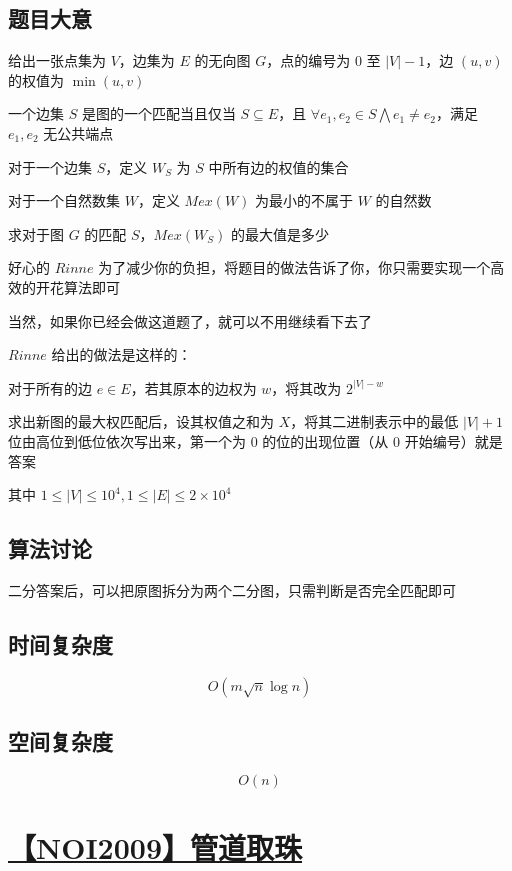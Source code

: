 \documentclass[UTF8]{article}
\begin{document}
\subsection{题目大意}

给出一张点集为 $V$，边集为 $E$ 的无向图 $G$，点的编号为 $0$ 至 $|V|-1$，边 $(u,v)$ 的权值为 $\min(u,v)$

一个边集 $S$ 是图的一个匹配当且仅当 $S \subseteq E$，且 $\forall e_1,e_2 \in S \bigwedge e_1 \neq e_2$，满足 $e_1,e_2$ 无公共端点

对于一个边集 $S$，定义 $W_S$ 为 $S$ 中所有边的权值的集合

对于一个自然数集 $W$，定义 $Mex(W)$ 为最小的不属于 $W$ 的自然数

求对于图 $G$ 的匹配 $S$，$Mex(W_S)$ 的最大值是多少

好心的 $Rinne$ 为了减少你的负担，将题目的做法告诉了你，你只需要实现一个高效的开花算法即可

当然，如果你已经会做这道题了，就可以不用继续看下去了

$Rinne$ 给出的做法是这样的：

对于所有的边 $e \in E$，若其原本的边权为 $w$，将其改为 $2^{|V|-w}$ 

求出新图的最大权匹配后，设其权值之和为 $X$，将其二进制表示中的最低 $|V|+1$ 位由高位到低位依次写出来，第一个为 $0$ 的位的出现位置（从 $0$ 开始编号）就是答案

其中 $1 \le |V| \le 10^4, 1 \le |E| \le 2 \times 10^4$

\subsection{算法讨论}

二分答案后，可以把原图拆分为两个二分图，只需判断是否完全匹配即可

\subsection{时间复杂度}

$$
O(m \sqrt n \log n)
$$

\subsection{空间复杂度}

$$
O(n)
$$

\section{\href{https://www.lydsy.com/JudgeOnline/problem.php?id=1566}{【NOI2009】管道取珠}}
\end{document}
